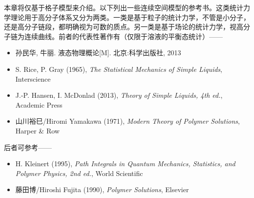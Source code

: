 \documentclass[main.tex]{subfiles}
\begin{document}
本章将仅基于格子模型来介绍。以下列出一些连续空间模型的参考书。这类统计力学理论用于高分子体系又分为两类。一类是基于粒子的统计力学，不管是小分子，还是高分子链段，都明确视为可数的质点。另一类是基于场论的统计力学，视高分子链为连续曲线。前者的代表性著作有（仅限于溶液的平衡态统计）——
\begin{itemize}
    \item 孙民华, 牛丽. 液态物理概论[M]. 北京:科学出版社, 2013
    \item S. Rice, P. Gray (1965), \emph{The Statistical Mechanics of Simple Liquids}, Interscience
    \item J.-P. Hansen, I. McDonlad (2013), \emph{Theory of Simple Liquids, 4th ed.}, Academic Press
    \item 山川裕巳/Hiromi Yamakawa (1971), \emph{Modern Theory of Polymer Solutions}, Harper \& Row
\end{itemize}
后者可参考——
\begin{itemize}
    \item H. Kleinert (1995), \emph{Path Integrals in Quantum Mechanics, Statistics, and Polymer Physics, 2nd ed.}, World Scientific
    \item 藤田博/Hiroshi Fujita (1990), \emph{Polymer Solutions}, Elsevier
\end{itemize}
\end{document}
